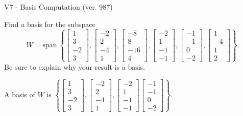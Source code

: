 \begin{exercise}
  \begin{exerciseTitle}V7 - Basis Computation (ver. 987)\end{exerciseTitle}
  \begin{exerciseStatement}
    Find a basis for the subspace 
\[W=\mathrm{span}\ \left\{\left[\begin{array}{r}
1 \\
3 \\
-2 \\
3
\end{array}\right] , \left[\begin{array}{r}
-2 \\
2 \\
-4 \\
1
\end{array}\right] , \left[\begin{array}{r}
-8 \\
8 \\
-16 \\
4
\end{array}\right] , \left[\begin{array}{r}
-2 \\
1 \\
-1 \\
-1
\end{array}\right] , \left[\begin{array}{r}
-1 \\
-1 \\
0 \\
-2
\end{array}\right] , \left[\begin{array}{r}
1 \\
-4 \\
1 \\
2
\end{array}\right]\right\}.\]
 Be sure to explain why your result is a basis.


  \end{exerciseStatement}
  \begin{exerciseAnswer}
   A basis of \(W\) is  \(\left\{\left[\begin{array}{r}
1 \\
3 \\
-2 \\
3
\end{array}\right] , \left[\begin{array}{r}
-2 \\
2 \\
-4 \\
1
\end{array}\right] , \left[\begin{array}{r}
-2 \\
1 \\
-1 \\
-1
\end{array}\right] \left[\begin{array}{r}
-1 \\
-1 \\
0 \\
-2
\end{array}\right]\right\}\).
  


  \end{exerciseAnswer}
\end{exercise}